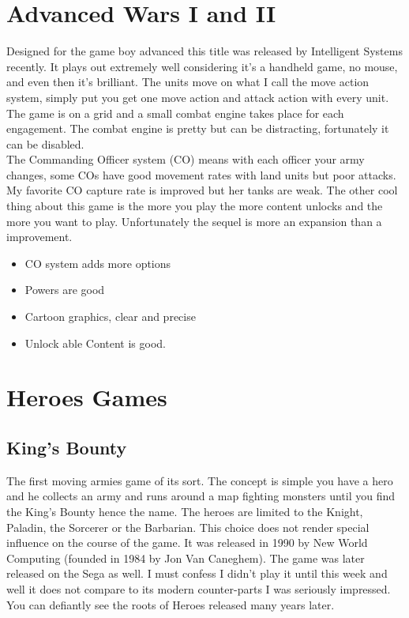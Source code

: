 \documentclass[a4paper]{article}
\begin{document}
\section{Advanced Wars I and II}
Designed for the game boy advanced this title was released by Intelligent Systems recently. It plays out extremely well considering it's a handheld game, no mouse, and even then it's brilliant. The units move on what I call the move action system, simply put you get one move action and attack action with every unit. The game is on a grid and a small combat engine takes place for each engagement. The combat engine is pretty but can be distracting, fortunately it can be disabled.\\
The Commanding Officer system (CO) means with each officer your army changes, some COs have good movement rates with land units but poor attacks. My favorite CO capture rate is improved but her tanks are weak. The other cool thing about this game is the more you play the more content unlocks and the more you want to play. Unfortunately the sequel is more an expansion than a improvement.\\
\begin{itemize}
\item CO system adds more options
\item Powers are good
\item Cartoon graphics, clear and precise
\item Unlock able Content is good.
\end{itemize}

\section{Heroes Games}
\subsection{King's Bounty}
The first moving armies game of its sort. The concept is simple you have a hero and he collects an army and runs around a map fighting monsters until you find the King's Bounty hence the name. The heroes are limited to the Knight, Paladin, the Sorcerer or the Barbarian. This choice does not render special influence on the course of the game. It was released in 1990 by New World Computing (founded in 1984 by Jon Van Caneghem). The game was later released on the Sega as well. I must confess I didn't play it until this week and well it does not compare to its modern counter-parts I was seriously impressed. You can defiantly see the roots of Heroes released many years later.
\end{document}
